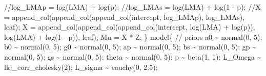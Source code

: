 \documentclass[
  12pt,
  letterpaper,
  DIV=11,
  numbers=noendperiod]{scrartcl}
\newenvironment{Shaded}{\begin{snugshade}}{\end{snugshade}}
\newcommand{\CommentTok}[1]{\textcolor[rgb]{0.37,0.37,0.37}{#1}}
\newcommand{\DecValTok}[1]{\textcolor[rgb]{0.68,0.00,0.00}{#1}}
\newcommand{\FloatTok}[1]{\textcolor[rgb]{0.68,0.00,0.00}{#1}}
\newcommand{\KeywordTok}[1]{\textcolor[rgb]{0.00,0.23,0.31}{#1}}
\newcommand{\NormalTok}[1]{\textcolor[rgb]{0.00,0.23,0.31}{#1}}
\begin{document}
\begin{Shaded}
\begin{Highlighting}[]
  \CommentTok{//log\_LMAp = log(LMA) + log(p);}
  \CommentTok{//log\_LMAs = log(LMA) + log(1 {-} p);}
  \CommentTok{//X = append\_col(append\_col(append\_col(intercept, log\_LMAp), log\_LMAs), leaf);}
\NormalTok{  X = append\_col(append\_col(append\_col(intercept,}
\NormalTok{    log(LMA) + log(p)),}
\NormalTok{    log(LMA) + log(}\DecValTok{1}\NormalTok{ {-} p)),}
\NormalTok{     leaf);}
\NormalTok{  Mu = X * Z;}
\NormalTok{\}}
\KeywordTok{model}\NormalTok{\{}
  \CommentTok{// priors}
\NormalTok{  a0 \textasciitilde{} normal(}\DecValTok{0}\NormalTok{, }\DecValTok{5}\NormalTok{);}
\NormalTok{  b0 \textasciitilde{} normal(}\DecValTok{0}\NormalTok{, }\DecValTok{5}\NormalTok{);}
\NormalTok{  g0 \textasciitilde{} normal(}\DecValTok{0}\NormalTok{, }\DecValTok{5}\NormalTok{);}
\NormalTok{  ap \textasciitilde{} normal(}\DecValTok{0}\NormalTok{, }\DecValTok{5}\NormalTok{);}
\NormalTok{  bs \textasciitilde{} normal(}\DecValTok{0}\NormalTok{, }\DecValTok{5}\NormalTok{);}
\NormalTok{  gp \textasciitilde{} normal(}\DecValTok{0}\NormalTok{, }\DecValTok{5}\NormalTok{);}
\NormalTok{  gs \textasciitilde{} normal(}\DecValTok{0}\NormalTok{, }\DecValTok{5}\NormalTok{);}
\NormalTok{  theta \textasciitilde{} normal(}\DecValTok{0}\NormalTok{, }\DecValTok{5}\NormalTok{);}
\NormalTok{  p \textasciitilde{} beta(}\DecValTok{1}\NormalTok{, }\DecValTok{1}\NormalTok{);}
\NormalTok{  L\_Omega \textasciitilde{} lkj\_corr\_cholesky(}\DecValTok{2}\NormalTok{);}
\NormalTok{  L\_sigma \textasciitilde{} cauchy(}\DecValTok{0}\NormalTok{, }\FloatTok{2.5}\NormalTok{);}


\end{Highlighting}
\end{Shaded}
\end{document}
